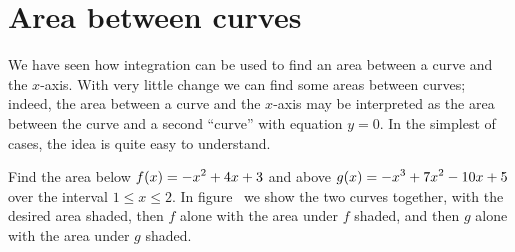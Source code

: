 \section{Area between curves}{}{}
\nobreak
We have seen how integration can be used to find an area between a
curve and the $x$-axis. With very little change we can find some areas
between curves; indeed, the area between a curve and the $x$-axis may
be interpreted as the area between the curve and a second ``curve''
with equation $y=0$. In the simplest of cases, the idea is quite easy
to understand.

\example Find the area below $\displaystyle f(x)= -x^2+4x+3$ and above
$\displaystyle g(x)=-x^3+7x^2-10x+5$ over the interval $1\le x\le2$. In
figure~ we show the two curves together, with
the desired area shaded, then $f$ alone with the area under $f$
shaded, and then $g$ alone with the area under $g$ shaded. 

